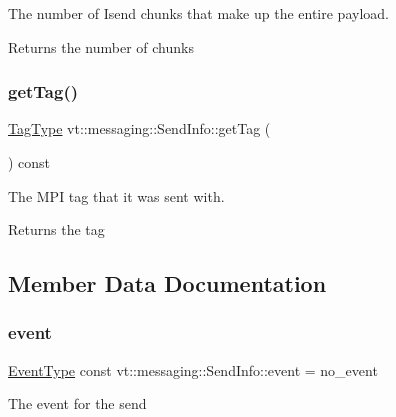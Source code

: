 The number of Isend chunks that make up the entire payload. 

\begin{DoxyReturn}{Returns}
the number of chunks 
\end{DoxyReturn}
\mbox{\label{structvt_1_1messaging_1_1_send_info_a2091dcc87c564afddebcfee8281aa464}} 
\subsubsection{\texorpdfstring{get\+Tag()}{getTag()}}
{\footnotesize\ttfamily \hyperlink{namespacevt_a84ab281dae04a52a4b243d6bf62d0e52}{Tag\+Type} vt\+::messaging\+::\+Send\+Info\+::get\+Tag (\begin{DoxyParamCaption}{ }\end{DoxyParamCaption}) const\hspace{0.3cm}{\ttfamily [inline]}}



The M\+PI tag that it was sent with. 

\begin{DoxyReturn}{Returns}
the tag 
\end{DoxyReturn}


\subsection{Member Data Documentation}
\mbox{\label{structvt_1_1messaging_1_1_send_info_a402eb83d6c831639bf01b07f4096d313}} 
\subsubsection{\texorpdfstring{event}{event}}
{\footnotesize\ttfamily \hyperlink{namespacevt_a009267401def7ae8bf201892222d060f}{Event\+Type} const vt\+::messaging\+::\+Send\+Info\+::event = no\+\_\+event\hspace{0.3cm}{\ttfamily [private]}}

The event for the send \mbox{\label{structvt_1_1messaging_1_1_send_info_ada975d93f03f94b12c35442b27359f50}} 
